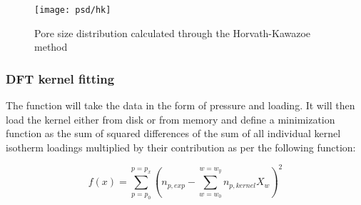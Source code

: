 \begin{figure}[h!]
	\texttt{[image: psd/hk]}
	\caption{Pore size distribution calculated through the Horvath-Kawazoe method}%
	\label{fig:pyg:fig:hk}
\end{figure}

\subsubsection{DFT kernel fitting}

The function will take the data in the form of pressure and loading. It will
then load the kernel either from disk or from memory and define a minimization
function as the sum of squared differences of the sum of all individual kernel
isotherm loadings multiplied by their contribution as per the following function:

\begin{equation}
	f(x) = \sum_{p=p_0}^{p=p_x} (n_{p,exp} - \sum_{w=w_0}^{w=w_y} n_{p, kernel} X_w )^2
\end{equation}